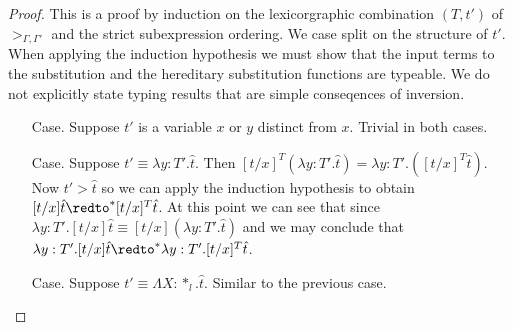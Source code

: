 \begin{proof}
  This is a proof by induction on the lexicorgraphic combination
$(T, t')$ of $>_{\Gamma,\Gamma'}$ and the strict subexpression ordering.
We case split on the structure of $t'$.  When applying
the induction hypothesis we must show that the input terms to the
substitution and the hereditary substitution functions are typeable.
We do not explicitly state typing results that are simple
conseqences of inversion.

\begin{itemize}
\item[Case.] Suppose $t'$ is a variable $x$ or $y$ distinct from $x$.  
  Trivial in both cases.
  
\item[Case.] Suppose $t' \equiv \lambda y:T'.\hat{t}$.  Then
  $[t/x]^T (\lambda y:T'.\hat{t}) = \lambda y:T'.([t/x]^T \hat{t})$. 
  Now $t' > \hat{t}$ so we can apply the induction hypothesis to obtain 
  $[t/x]\hat{t} \redto^* [t/x]^T \hat{t}$.  At this point we can see that since 
  $\lambda y:T'.[t/x]\hat{t} \equiv [t/x](\lambda y:T'.\hat{t})$ and we may
  conclude that $\lambda y:T'.[t/x]\hat{t} \redto^* \lambda y:T'.[t/x]^T \hat{t}$.
  
\item[Case.] Suppose $t' \equiv \Lambda X:*_l.\hat{t}$.  Similar to the previous case.  


\end{itemize}
\end{proof}
